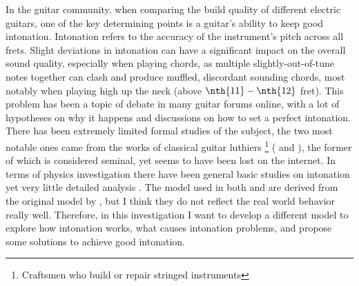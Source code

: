 In the guitar community, when comparing the build quality of different electric guitars, one of the key determining points is a guitar's ability to keep good intonation. Intonation refers to the accuracy of the instrument’s pitch across all frets. Slight deviations in intonation can have a significant impact on the overall sound quality, especially when playing chords, as multiple slightly-out-of-tune notes together can clash and produce muffled, discordant sounding chords, most notably when playing high up the neck (above $\nth{11}-\nth{12}$ fret). This problem has been a topic of debate in many guitar forums online, with a lot of hypotheses on why it happens and discussions on how to set a perfect intonation. There has been extremely limited formal studies of the subject, the two most notable ones came from the works of classical guitar luthiers \footnote{Craftsmen who build or repair stringed instruments} (\cite{bartolinis} and \cite{byers}), the former of which is considered seminal, yet seems to have been lost on the internet. In terms of physics investigation there have been general basic studies on intonation yet very little detailed analysis \cite{varieschi}. The model used in both \cite{byers} and \cite{varieschi} are derived from the original model by \cite{bartolinis}, but I think they do not reflect the real world behavior really well. Therefore, in this investigation I want to develop a different model to explore how intonation works, what causes intonation problems, and propose some solutions to achieve good intonation.